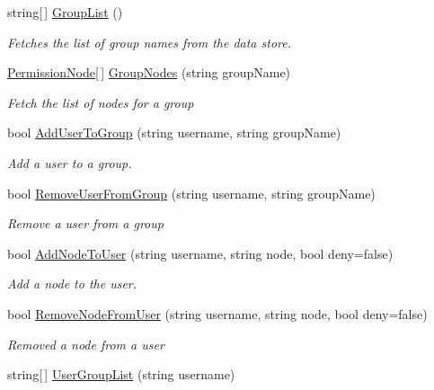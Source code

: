 \begin{DoxyCompactItemize}
string\mbox{[}$\,$\mbox{]} \hyperlink{interface_o_t_a_1_1_data_1_1_i_permission_handler_a6556edbd59ee5e4238262048a56e3e54}{Group\+List} ()
\begin{DoxyCompactList}\small\item\em Fetches the list of group names from the data store. \end{DoxyCompactList}\item 
\hyperlink{struct_o_t_a_1_1_data_1_1_permission_node}{Permission\+Node}\mbox{[}$\,$\mbox{]} \hyperlink{interface_o_t_a_1_1_data_1_1_i_permission_handler_ad3b996b650f80e3f23bc02c9e19d3bbe}{Group\+Nodes} (string group\+Name)
\begin{DoxyCompactList}\small\item\em Fetch the list of nodes for a group \end{DoxyCompactList}\item 
bool \hyperlink{interface_o_t_a_1_1_data_1_1_i_permission_handler_a2fdd0b8e9ef34f6006a087007c920937}{Add\+User\+To\+Group} (string username, string group\+Name)
\begin{DoxyCompactList}\small\item\em Add a user to a group. \end{DoxyCompactList}\item 
bool \hyperlink{interface_o_t_a_1_1_data_1_1_i_permission_handler_ae7d0c994d0e4a3509ecde3dc5748c4d0}{Remove\+User\+From\+Group} (string username, string group\+Name)
\begin{DoxyCompactList}\small\item\em Remove a user from a group \end{DoxyCompactList}\item 
bool \hyperlink{interface_o_t_a_1_1_data_1_1_i_permission_handler_a9b917c71bef8e5f725d74932cf162c7c}{Add\+Node\+To\+User} (string username, string node, bool deny=false)
\begin{DoxyCompactList}\small\item\em Add a node to the user. \end{DoxyCompactList}\item 
bool \hyperlink{interface_o_t_a_1_1_data_1_1_i_permission_handler_a122c2458f8500ed394cffb9b649b9302}{Remove\+Node\+From\+User} (string username, string node, bool deny=false)
\begin{DoxyCompactList}\small\item\em Removed a node from a user \end{DoxyCompactList}\item 
string\mbox{[}$\,$\mbox{]} \hyperlink{interface_o_t_a_1_1_data_1_1_i_permission_handler_af6032f726116bbf7e53bce01d09f2d61}{User\+Group\+List} (string username)

\end{DoxyCompactItemize}
